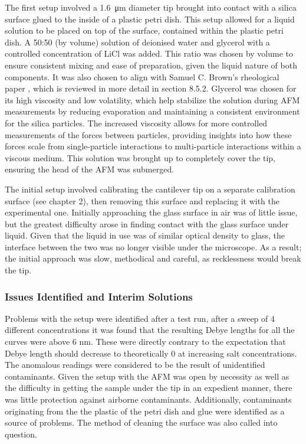 The first setup involved a \SI{1.6}{\micro\metre} diameter tip brought into contact with a silica surface glued to the inside of a plastic petri dish. This setup allowed for a liquid solution to be placed on top of the surface, contained within the plastic petri dish. A 50:50 (by volume) solution of deionised water and glycerol with a controlled concentration of LiCl was added. This ratio was chosen by volume to ensure consistent mixing and ease of preparation, given the liquid nature of both components. It was also chosen to align with Samuel C. Brown's rheological paper \cite{reference4}, which is reviewed in more detail in section 8.5.2. Glycerol was chosen for its high viscosity and low volatility, which help stabilize the solution during AFM measurements by reducing evaporation and maintaining a consistent environment for the silica particles. The increased viscosity allows for more controlled measurements of the forces between particles, providing insights into how these forces scale from single-particle interactions to multi-particle interactions within a viscous medium. This solution was brought up to completely cover the tip, ensuring the head of the AFM was submerged.

The initial setup involved calibrating the cantilever tip on a separate calibration surface (see chapter 2), then removing this surface and replacing it with the experimental one. Initially approaching the glass surface in air was of little issue, but the greatest difficulty arose in finding contact with the glass surface under liquid. Given that the liquid in use was of similar optical density to glass, the interface between the two was no longer visible under the microscope. As a result; the initial approach was slow, methodical and careful, as recklessness would break the tip. 

\subsubsection{Issues Identified and Interim Solutions}

Problems with the setup were identified after a test run, after a sweep of 4 different concentrations it was found that the resulting Debye lengths for all the curves were above 6 nm. These were directly contrary to the expectation that Debye length should decrease to theoretically 0 at increasing salt concentrations. The anomalous readings were considered to be the result of unidentified contaminants. Given the setup with the AFM was open by necessity as well as the difficulty in getting the sample under the tip in an expedient manner, there was little protection against airborne contaminants. Additionally, contaminants originating from the the plastic of the petri dish and glue were identified as a source of problems. The method of cleaning the surface was also called into question. %

